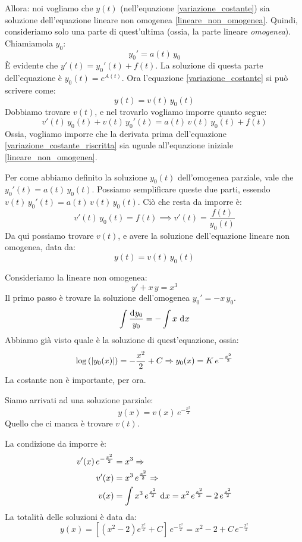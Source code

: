 Allora: noi vogliamo che $y(t)$ (nell'equazione \ref{variazione_costante}) sia soluzione dell'equazione lineare non omogenea \ref{lineare_non_omogenea}. Quindi, consideriamo solo una parte di quest'ultima (ossia, la parte lineare \emph{omogenea}). Chiamiamola $y_0$:
\[
y_0' = a(t) \, y_0
\]
\`E evidente che $y'(t) = y_0'(t) + f(t)$. La soluzione di questa parte dell'equazione \`e $y_0 (t) = e^{A(t)}$. Ora l'equazione \ref{variazione_costante} si pu\`o scrivere come:
\begin{equation}
\label{variazione_costante_riscritta}
y(t) = v(t) \, y_0 (t)
\end{equation}
Dobbiamo trovare $v(t)$, e nel trovarlo vogliamo imporre quanto segue:
\[
v'(t) \, y_0 (t) + v(t) \, y_0'(t) = a(t) \, v(t) \, y_0 (t) + f(t)
\]
Ossia, vogliamo imporre che la derivata prima dell'equazione \ref{variazione_costante_riscritta} sia uguale all'equazione iniziale \ref{lineare_non_omogenea}.

Per come abbiamo definito la soluzione $y_0 (t)$ dell'omogenea parziale, vale che $y_0' (t) = a(t) \, y_0 (t)$. Possiamo semplificare queste due parti, essendo $v(t) \, y_0' (t) = a(t) \, v(t) \, y_0 (t)$. Ci\`o che resta da imporre \`e:
\[
v'(t) \, y_0 (t) = f(t) \implies v'(t) = \frac{f(t)}{y_0 (t)}
\]
Da qui possiamo trovare $v(t)$, e avere la soluzione dell'equazione lineare non omogenea, data da:
\[
y(t) = v(t) \, y_0 (t)
\]

\begin{exmp}
Consideriamo la lineare non omogenea:
\[
y' + x \, y = x^3
\]
Il primo passo \`e trovare la soluzione dell'omogenea $y_0' = - x \, y_0$.
\[
\int \frac{\diff y_0}{y_0} = - \int x \dx
\]
Abbiamo gi\`a visto quale \`e la soluzione di quest'equazione, ossia:
\[
\log \left( \left\lvert{y_0 (x)}\right\rvert \right) = - \frac{x^2}{2} + C \Rightarrow
y_0 (x) = K \, e^{- \frac{x^2}{2}}
\]
La costante non \`e importante, per ora.

Siamo arrivati ad una soluzione parziale:
\[
y(x) = v(x) \, e^{-\frac{x^2}{2}}
\]
Quello che ci manca \`e trovare $v(t)$.

La condizione da imporre \`e:
\begin{align*}
v' (x) \, e^{-\frac{x^2}{2}} &= x^3 \implies \\
v'(x) &= x^3 \, e^{\frac{x^2}{2}} \implies \\
v(x) &= \int x^3 \, e^{\frac{x^2}{2}} \dx =
x^2 \, e^{\frac{x^2}{2}} - 2 \, e^{\frac{x^2}{2}} 
\end{align*}
La totalit\`a delle soluzioni \`e data da:
\[
y(x) = \left[ \left( x^2 - 2 \right) e^{\frac{x^2}{2}} + C \right] \, e^{- \frac{x^2}{2}} = 
x^2 - 2 + C \, e^{-\frac{x^2}{2}}
\]
\end{exmp}

